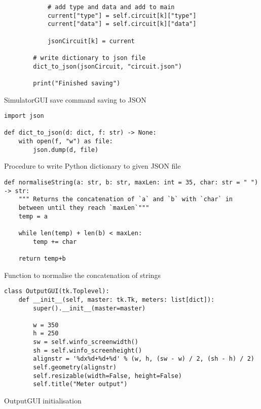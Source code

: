 \newpage
\begin{listing}[!ht]
    \begin{verbatim}
            # add type and data and add to main
            current["type"] = self.circuit[k]["type"]
            current["data"] = self.circuit[k]["data"]

            jsonCircuit[k] = current
            
        # write dictionary to json file
        dict_to_json(jsonCircuit, "circuit.json")
        
        print("Finished saving")
    \end{verbatim}
    \caption{SimulatorGUI save command saving to JSON}
    \label{sc:simgui-save-cmd-4}
\end{listing}

\newpage
\begin{listing}[!ht]
    \begin{verbatim}
import json

def dict_to_json(d: dict, f: str) -> None:
    with open(f, "w") as file:
        json.dump(d, file)
    \end{verbatim}
    \caption{Procedure to write Python dictionary to given JSON file}
    \label{sc:dict2json-procedure}
\end{listing}

\newpage
\begin{listing}[!ht]
    \begin{verbatim}
def normaliseString(a: str, b: str, maxLen: int = 35, char: str = " ") -> str:
    """ Returns the concatenation of `a` and `b` with `char` in 
    between until they reach `maxLen`"""
    temp = a

    while len(temp) + len(b) < maxLen:
        temp += char

    return temp+b
    \end{verbatim}
    \caption{Function to normalise the concatenation of strings}
    \label{sc:normalise-string-function}
\end{listing}


\newpage
\begin{listing}[!ht]
    \begin{verbatim}
class OutputGUI(tk.Toplevel):
    def __init__(self, master: tk.Tk, meters: list[dict]):
        super().__init__(master=master)
        
        w = 350
        h = 250
        sw = self.winfo_screenwidth()
        sh = self.winfo_screenheight()
        alignstr = '%dx%d+%d+%d' % (w, h, (sw - w) / 2, (sh - h) / 2)
        self.geometry(alignstr)
        self.resizable(width=False, height=False)
        self.title("Meter output")
    \end{verbatim}
    \caption{OutputGUI initialisation}
    \label{sc:outputgui-init}
\end{listing}

